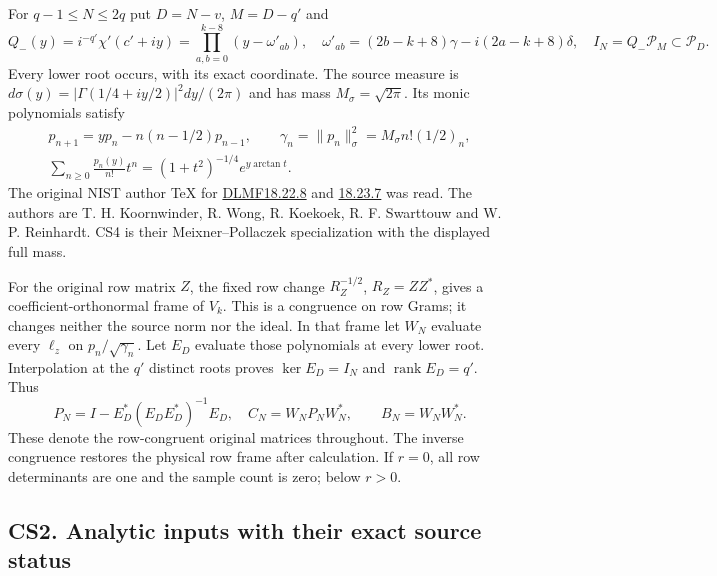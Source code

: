 \documentclass[11pt]{article}
\begin{document}
For \(q-1\le N\le2q\) put \(D=N-v\), \(M=D-q'\) and \[
 Q_-(y)=i^{-q'}\chi'(c'+iy)=\prod_{a,b=0}^{k-8}(y-\omega'_{ab}),
 \quad \omega'_{ab}=(2b-k+8)\gamma-i(2a-k+8)\delta,
 \quad I_N=Q_-\mathcal P_M\subset\mathcal P_D.
 \tag{CS3}
\] Every lower root occurs, with its exact coordinate. The source measure is \(d\sigma(y)=|\Gamma(1/4+iy/2)|^2dy/(2\pi)\) and has mass \(M_\sigma=\sqrt{2\pi}\). Its monic polynomials satisfy \[
\begin{gathered}
 p_{n+1}=yp_n-n(n-1/2)p_{n-1},\qquad \gamma_n=\|p_n\|_\sigma^2=M_\sigma n!(1/2)_n,\\
 \sum_{n\ge0}\frac{p_n(y)}{n!}t^n=(1+t^2)^{-1/4}e^{y\arctan t}.
\end{gathered}
 \tag{CS4}
\] The original NIST author TeX for \href{https://dlmf.nist.gov/18.22.E8}{DLMF18.22.8} and \href{https://dlmf.nist.gov/18.23.E7}{18.23.7} was read. The authors are T. H. Koornwinder, R. Wong, R. Koekoek, R. F. Swarttouw and W. P. Reinhardt. CS4 is their Meixner--Pollaczek specialization with the displayed full mass.

For the original row matrix \(Z\), the fixed row change \(R_Z^{-1/2}\), \(R_Z=ZZ^*\), gives a coefficient-orthonormal frame of \(V_k\). This is a congruence on row Grams; it changes neither the source norm nor the ideal. In that frame let \(W_N\) evaluate every \(\ell_z\) on \(p_n/\sqrt{\gamma_n}\). Let \(E_D\) evaluate those polynomials at every lower root. Interpolation at the \(q'\) distinct roots proves \(\ker E_D=I_N\) and \(\operatorname{rank}E_D=q'\). Thus \[
 P_N=I-E_D^*(E_DE_D^*)^{-1}E_D,
 \quad C_N=W_NP_NW_N^*,\qquad B_N=W_NW_N^*.
 \tag{CS5}
\] These denote the row-congruent original matrices throughout. The inverse congruence restores the physical row frame after calculation. If \(r=0\), all row determinants are one and the sample count is zero; below \(r>0\).

\subsection{CS2. Analytic inputs with their exact source status}\label{cs2.-analytic-inputs-with-their-exact-source-status}
\end{document}
